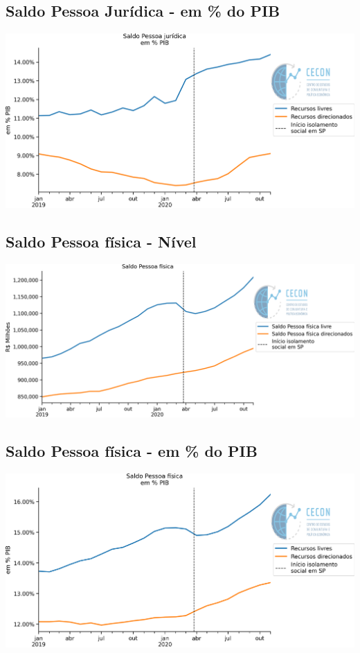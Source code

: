 \documentclass{SelfArx}
\begin{document}
\subsection*{Saldo Pessoa Jurídica - em \% do PIB}
\label{sec:orgd6c762e}
\begin{center}
\includegraphics[width=.9\linewidth]{./figs/Credito/SaldoPJ_PIB.png}
\end{center}

\subsection*{Saldo Pessoa física - Nível}
\label{sec:org8dcc934}

\begin{center}
\includegraphics[width=.9\linewidth]{./figs/Credito/SaldoPF.png}
\end{center}


\subsection*{Saldo Pessoa física - em \% do PIB}
\label{sec:org745e823}

\begin{center}
\includegraphics[width=.9\linewidth]{./figs/Credito/SaldoPF_PIB.png}
\end{center}
\end{document}
